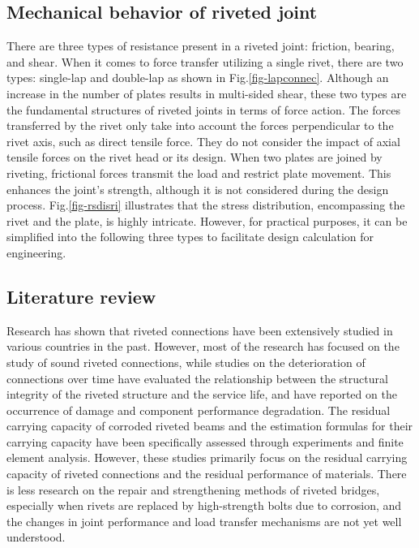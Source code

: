 \subsection{Mechanical behavior of riveted joint}

There are three types of resistance present in a riveted joint: friction, bearing, and shear. When it comes to force transfer utilizing a single rivet, there are two types: single-lap and double-lap as shown in Fig.\ref{fig-lapconnec}. Although an increase in the number of plates results in multi-sided shear, these two types are the fundamental structures of riveted joints in terms of force action. The forces transferred by the rivet only take into account the forces perpendicular to the rivet axis, such as direct tensile force. They do not consider the impact of axial tensile forces on the rivet head or its design. When two plates are joined by riveting, frictional forces transmit the load and restrict plate movement. This enhances the joint's strength, although it is not considered during the design process. Fig.\ref{fig-rsdisri} illustrates that the stress distribution, encompassing the rivet and the plate, is highly intricate. However, for practical purposes, it can be simplified into the following three types to facilitate design calculation for engineering.


\subsection{Literature review}

Research has shown that riveted connections have been extensively studied in various countries in the past. However, most of the research has focused on the study of sound riveted connections, while studies on the deterioration of connections over time have evaluated the relationship between the structural integrity of the riveted structure and the service life, and have reported on the occurrence of damage and component performance degradation. The residual carrying capacity of corroded riveted beams and the estimation formulas for their carrying capacity have been specifically assessed through experiments and finite element analysis. However, these studies primarily focus on the residual carrying capacity of riveted connections and the residual performance of materials. There is less research on the repair and strengthening methods of riveted bridges, especially when rivets are replaced by high-strength bolts due to corrosion, and the changes in joint performance and load transfer mechanisms are not yet well understood.

